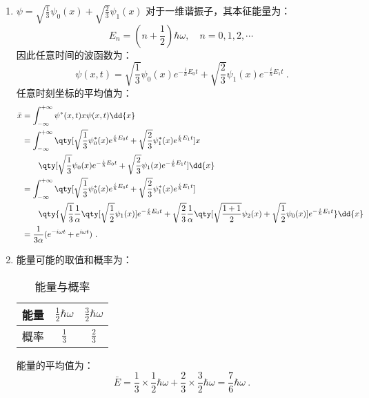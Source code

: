 \subsection{ }
\begin{enumerate}
\item $\psi=\sqrt{\frac{1}{3}}\psi_{0}(x)+\sqrt{\frac{2}{3}}\psi_{1}(x)$
对于一维谐振子，其本征能量为：
\begin{equation}
E_{n}=(n+\frac{1}{2})\hbar \omega,\quad n=0,1,2,\cdots~
\end{equation}
因此任意时间的波函数为：
\begin{equation}
\psi(x,t)=\sqrt{\frac{1}{3}}\psi_{0}(x)e^{-\frac{i}{\hbar}E_{0}t}+\sqrt{\frac{2}{3}}\psi_{1}(x)e^{-\frac{i}{\hbar}E_{1}t}~.
\end{equation}
任意时刻坐标的平均值为：
\begin{equation}
\begin{aligned}
\bar{x}&=\int^{+\infty}_{-\infty}\psi^{*}(x,t)x\psi(x,t)\dd{x} \\
&=\int^{+\infty}_{-\infty} \qty[\sqrt{\frac{1}{3}}\psi^{*}_{0}(x)e^{\frac{i}{\hbar}E_{0}t}+\sqrt{\frac{2}{3}}\psi^{*}_{1}(x)e^{\frac{i}{\hbar}E_{1}t}]x\\
&\qquad \qty[\sqrt{\frac{1}{3}}\psi_{0}(x)e^{-\frac{i}{\hbar}E_{0}t}+\sqrt{\frac{2}{3}}\psi_{1}(x)e^{-\frac{i}{\hbar}E_{1}t}]\dd{x} \\
&=\int^{+\infty}_{-\infty} \qty[\sqrt{\frac{1}{3}}\psi^{*}_{0}(x)e^{\frac{i}{\hbar}E_{0}t}+\sqrt{\frac{2}{3}}\psi^{*}_{1}(x)e^{\frac{i}{\hbar}E_{1}t}]\\
&\qquad \qty{\sqrt{\frac{1}{3}}\frac{1}{\alpha}\qty[\sqrt{\frac{1}{2}}\psi_{1}(x)]e^{-\frac{i}{\hbar}E_{0}t}+\sqrt{\frac{2}{3}}\frac{1}{\alpha}\qty[\sqrt{\frac{1+1}{2}}\psi_{2}(x)+\sqrt{\frac{1}{2}}\psi_{0}(x)]e^{-\frac{i}{\hbar}E_{1}t}}\dd{x} \\
&=\frac{1}{3\alpha}(e^{-i\omega t}+e^{i\omega t})~.
\end{aligned}
\end{equation}

\item 能量可能的取值和概率为：
\begin{table}[ht]
\centering
\caption{能量与概率}\label{tab_TJU14A_2}
\begin{tabular}{|c|c|c|}
\hline
能量 & $\frac{1}{2}\hbar\omega$ & $\frac{3}{2}\hbar\omega$ \\
\hline
概率 & $\frac{1}{3}$ & $\frac{2}{3}$ \\
\hline
\end{tabular}
\end{table}
能量的平均值为：
\begin{equation}
\bar{E}=\frac{1}{3}\times \frac{1}{2}\hbar\omega + \frac{2}{3}\times \frac{3}{2}\hbar\omega=\frac{7}{6}\hbar\omega~.
\end{equation}
\end{enumerate}
